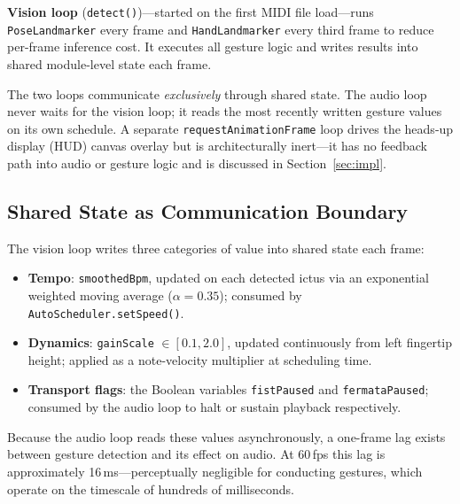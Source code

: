 \documentclass[conference]{IEEEtran}
\begin{document}
\textbf{Vision loop} (\texttt{detect()})---started on the first MIDI
file load---runs \texttt{PoseLandmarker} every frame and
\texttt{HandLandmarker} every third frame to reduce per-frame inference
cost. It executes all gesture logic and writes results into shared
module-level state each frame.

The two loops communicate \emph{exclusively} through shared state. The
audio loop never waits for the vision loop; it reads the most recently
written gesture values on its own schedule. A separate
\texttt{requestAnimationFrame} loop drives the heads-up display (HUD)
canvas overlay but is architecturally inert---it has no feedback path
into audio or gesture logic and is discussed in
Section~\ref{sec:impl}.

\subsection{Shared State as Communication Boundary}

The vision loop writes three categories of value into shared state
each frame:

\begin{itemize}
  \item \textbf{Tempo}: \texttt{smoothedBpm}, updated on each
  detected ictus via an exponential weighted moving average
  ($\alpha = 0.35$); consumed by \texttt{AutoScheduler.setSpeed()}.
  \item \textbf{Dynamics}: \texttt{gainScale} $\in [0.1, 2.0]$,
  updated continuously from left fingertip height; applied as a
  note-velocity multiplier at scheduling time.
  \item \textbf{Transport flags}: the Boolean variables
  \texttt{fistPaused} and \texttt{fermataPaused}; consumed by the
  audio loop to halt or sustain playback respectively.
\end{itemize}

Because the audio loop reads these values asynchronously, a one-frame
lag exists between gesture detection and its effect on audio. At
60\,fps this lag is approximately 16\,ms---perceptually negligible for
conducting gestures, which operate on the timescale of hundreds of
milliseconds.
\end{document}
